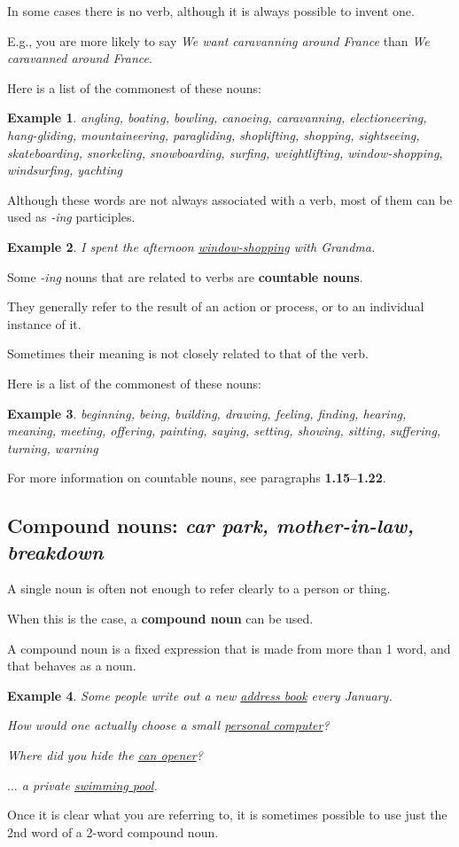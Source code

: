 \documentclass[oneside]{book}
\numberwithin{equation}{section}
\newtheorem{example}{Example}[section]
\begin{document}
In some cases there is no verb, although it is always possible to invent one.

E.g., you are more likely to say \textit{We want caravanning around France} than \textit{We caravanned around France}.

%
Here is a list of the commonest of these nouns:
\begin{example}
    angling, boating, bowling, canoeing, caravanning, electioneering, hang-gliding, mountaineering, paragliding, shoplifting, shopping, sightseeing, skateboarding, snorkeling, snowboarding, surfing, weightlifting, window-shopping, windsurfing, yachting
\end{example}
Although these words are not always associated with a verb, most of them can be used as \textit{-ing} participles.
\begin{example}
    I spent the afternoon \underline{window-shopping} with Grandma.
\end{example}
%
\noindent{} Some \textit{-ing} nouns that are related to verbs are \textbf{countable nouns}.

They generally refer to the result of an action or process, or to an individual instance of it.

Sometimes their meaning is not closely related to that of the verb.

%
Here is a list of the commonest of these nouns:
\begin{example}
    beginning, being, building, drawing, feeling, finding, hearing, meaning, meeting, offering, painting, saying, setting, showing, sitting, suffering, turning, warning
\end{example}
For more information on countable nouns, see paragraphs \textbf{1.15--1.22}.

\subsection{Compound nouns: \textit{car park, mother-in-law, breakdown}}
\noindent{} A single noun is often not enough to refer clearly to a person or thing.

When this is the case, a \textbf{compound noun} can be used.

A compound noun is a fixed expression that is made from more than 1 word, and that behaves as a noun.
\begin{example}
    Some people write out a new \underline{address book} every January.
    
    How would one actually choose a small \underline{personal computer}?
    
    Where did you hide the \underline{can opener}?
    
    $\ldots$ a private \underline{swimming pool}.
\end{example}
Once it is clear what you are referring to, it is sometimes possible to use just the 2nd word of a 2-word compound noun.
\end{document}
